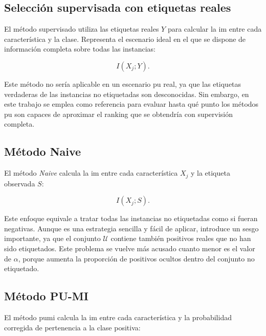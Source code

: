 \subsection{Selección supervisada con etiquetas reales}
\label{subsec:supervisado}

El método supervisado utiliza las etiquetas reales $Y$ para calcular la \acrshort{im} entre cada característica y la clase. Representa el escenario ideal en el que se dispone de información completa sobre todas las instancias:

\begin{equation}
I(X_j;Y).
\label{eq:mi_supervisada}
\end{equation}

Este método no sería aplicable en un escenario \acrshort{pu} real, ya que las etiquetas verdaderas de las instancias no etiquetadas son desconocidas. Sin embargo, en este trabajo se emplea como referencia para evaluar hasta qué punto los métodos \acrshort{pu} son capaces de aproximar el ranking que se obtendría con supervisión completa.

\subsection{Método Naive}
\label{subsec:naive}

El método \textit{Naive} calcula la \acrshort{im} entre cada característica $X_j$ y la etiqueta observada $S$:

\begin{equation}
I(X_j;S).
\label{eq:mi_naive}
\end{equation}

Este enfoque equivale a tratar todas las instancias no etiquetadas como si fueran negativas. Aunque es una estrategia sencilla y fácil de aplicar, introduce un sesgo importante, ya que el conjunto $\mathcal{U}$ contiene también positivos reales que no han sido etiquetados. Este problema se vuelve más acusado cuanto menor es el valor de $\alpha$, porque aumenta la proporción de positivos ocultos dentro del conjunto no etiquetado.

\subsection{Método PU-MI}
\label{subsec:pumi_comparado}

El método \acrshort{pumi} calcula la \acrshort{im} entre cada característica y la probabilidad corregida de pertenencia a la clase positiva:


